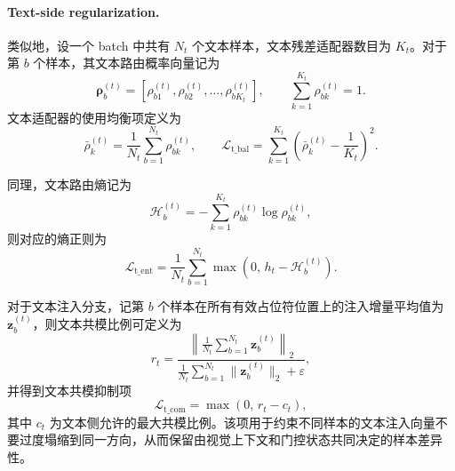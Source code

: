 \documentclass[journal]{IEEEtran}
\begin{document}
\paragraph{Text-side regularization.}
类似地，设一个 batch 中共有 $N_t$ 个文本样本，文本残差适配器数目为 $K_t$。对于第 $b$ 个样本，其文本路由概率向量记为
\begin{equation}
\boldsymbol{\rho}^{(t)}_b
=
\left[\rho^{(t)}_{b1},\rho^{(t)}_{b2},\ldots,\rho^{(t)}_{bK_t}\right],
\qquad
\sum_{k=1}^{K_t}\rho^{(t)}_{bk}=1.
\end{equation}
文本适配器的使用均衡项定义为
\begin{equation}
\bar{\rho}^{(t)}_{k}
=
\frac{1}{N_t}\sum_{b=1}^{N_t}\rho^{(t)}_{bk},
\qquad
\mathcal{L}_{\mathrm{t\_bal}}
=
\sum_{k=1}^{K_t}
\left(
\bar{\rho}^{(t)}_{k}-\frac{1}{K_t}
\right)^2.
\end{equation}

同理，文本路由熵记为
\begin{equation}
\mathcal{H}^{(t)}_b
=
-
\sum_{k=1}^{K_t}
\rho^{(t)}_{bk}\log \rho^{(t)}_{bk},
\end{equation}
则对应的熵正则为
\begin{equation}
\mathcal{L}_{\mathrm{t\_ent}}
=
\frac{1}{N_t}
\sum_{b=1}^{N_t}
\max\!\left(0,\, h_t-\mathcal{H}^{(t)}_b\right).
\end{equation}

对于文本注入分支，记第 $b$ 个样本在所有有效占位符位置上的注入增量平均值为 $\mathbf{z}^{(t)}_b$，则文本共模比例可定义为
\begin{equation}
r_t
=
\frac{
\left\|
\frac{1}{N_t}\sum_{b=1}^{N_t}\mathbf{z}^{(t)}_b
\right\|_2
}{
\frac{1}{N_t}\sum_{b=1}^{N_t}\|\mathbf{z}^{(t)}_b\|_2+\varepsilon
},
\end{equation}
并得到文本共模抑制项
\begin{equation}
\mathcal{L}_{\mathrm{t\_com}}
=
\max(0,\, r_t-c_t),
\end{equation}
其中 $c_t$ 为文本侧允许的最大共模比例。该项用于约束不同样本的文本注入向量不要过度塌缩到同一方向，从而保留由视觉上下文和门控状态共同决定的样本差异性。
\end{document}

